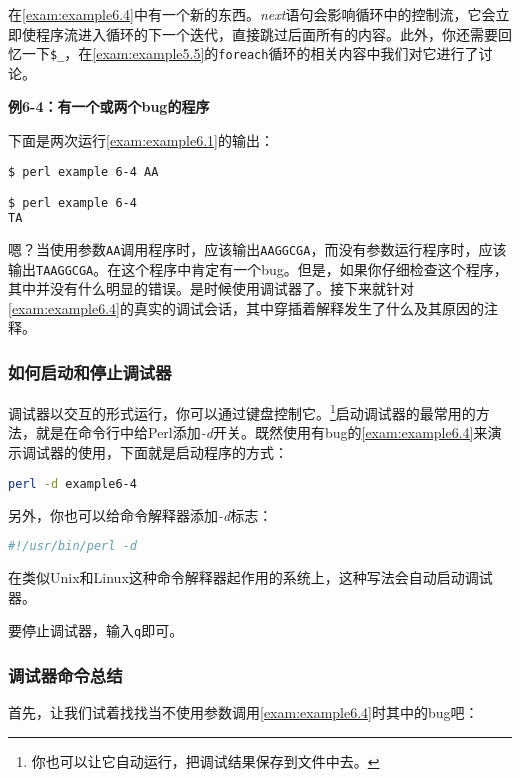 在\autoref{exam:example6.4}中有一个新的东西。\textit{next}语句会影响循环中的控制流，它会立即使程序流进入循环的下一个迭代，直接跳过后面所有的内容。此外，你还需要回忆一下\verb|$_|，在\autoref{exam:example5.5}的\verb|foreach|循环的相关内容中我们对它进行了讨论。

\textbf{例6-4：有一个或两个bug的程序}


下面是两次运行\autoref{exam:example6.1}的输出：

\begin{lstlisting}[language=bash]
$ perl example 6-4 AA

$ perl example 6-4
TA
\end{lstlisting}

嗯？当使用参数\verb|AA|调用程序时，应该输出\verb|AAGGCGA|，而没有参数运行程序时，应该输出\verb|TAAGGCGA|。在这个程序中肯定有一个bug。但是，如果你仔细检查这个程序，其中并没有什么明显的错误。是时候使用调试器了。接下来就针对\autoref{exam:example6.4}的真实的调试会话，其中穿插着解释发生了什么及其原因的注释。

\subsubsection{如何启动和停止调试器}
调试器以交互的形式运行，你可以通过键盘控制它。\footnote{你也可以让它自动运行，把调试结果保存到文件中去。}启动调试器的最常用的方法，就是在命令行中给Perl添加\textit{-d}开关。既然使用有bug的\autoref{exam:example6.4}来演示调试器的使用，下面就是启动程序的方式：

\begin{lstlisting}[language=bash]
perl -d example6-4
\end{lstlisting}

另外，你也可以给命令解释器添加\textit{-d}标志：

\begin{lstlisting}[language=bash]
#!/usr/bin/perl -d
\end{lstlisting}

在类似Unix和Linux这种命令解释器起作用的系统上，这种写法会自动启动调试器。

要停止调试器，输入\verb|q|即可。

\subsubsection{调试器命令总结}
首先，让我们试着找找当不使用参数调用\autoref{exam:example6.4}时其中的bug吧：

